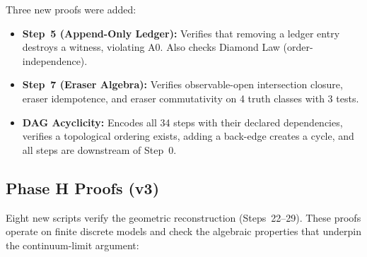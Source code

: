 Three new proofs were added:

\begin{itemize}
  \item \textbf{Step~5 (Append-Only Ledger):} Verifies that removing a
    ledger entry destroys a witness, violating A0.  Also checks Diamond Law
    (order-independence).

  \item \textbf{Step~7 (Eraser Algebra):} Verifies observable-open
    intersection closure, eraser idempotence, and eraser commutativity on 4
    truth classes with 3 tests.

  \item \textbf{DAG Acyclicity:} Encodes all 34 steps with their declared
    dependencies, verifies a topological ordering exists, adding a back-edge
    creates a cycle, and all steps are downstream of Step~0.
\end{itemize}

\subsection{Phase H Proofs (v3)}

Eight new scripts verify the geometric reconstruction (Steps~22--29).
These proofs operate on finite discrete models and check the algebraic
properties that underpin the continuum-limit argument:

